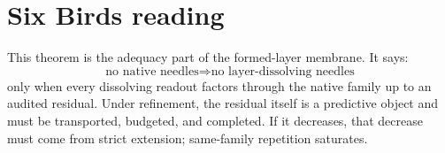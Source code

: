 \documentclass[11pt]{article}
\begin{document}
\section{Six Birds reading}
This theorem is the adequacy part of the formed-layer membrane.  It says:
\[
\text{no native needles}
\Rightarrow
\text{no layer-dissolving needles}
\]
only when every dissolving readout factors through the native family up to an audited residual.  Under refinement, the residual itself is a predictive object and must be transported, budgeted, and completed.  If it decreases, that decrease must come from strict extension; same-family repetition saturates.
\end{document}
